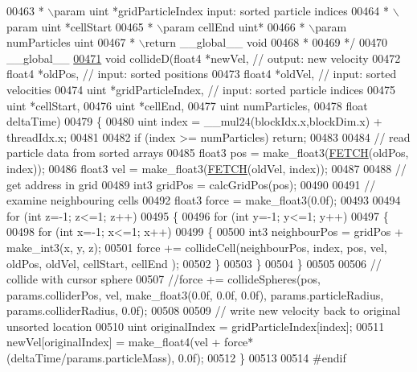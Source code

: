\begin{DoxyCode}
00463 \textcolor{comment}{ * \(\backslash\)param uint   *gridParticleIndex input: sorted particle indices}
00464 \textcolor{comment}{ * \(\backslash\)param uint   *cellStart}
00465 \textcolor{comment}{ * \(\backslash\)param cellEnd uint*}
00466 \textcolor{comment}{ * \(\backslash\)param numParticles uint}
00467 \textcolor{comment}{ * \(\backslash\)return \_\_global\_\_ void}
00468 \textcolor{comment}{ *}
00469 \textcolor{comment}{ */}
00470 \_\_global\_\_
\hypertarget{particles__kernel__impl_8cuh_source_l00471}{}\hyperlink{particles__kernel__impl_8cuh_a295ed0293da0aab40ac5d904c319abdf}{00471} \textcolor{keywordtype}{void} collideD(float4 *newVel,               \textcolor{comment}{// output: new velocity}
00472               float4 *oldPos,               \textcolor{comment}{// input: sorted positions}
00473               float4 *oldVel,               \textcolor{comment}{// input: sorted velocities}
00474               uint   *gridParticleIndex,    \textcolor{comment}{// input: sorted particle indices}
00475               uint   *cellStart,
00476               uint   *cellEnd,
00477               uint    numParticles,
00478                           \textcolor{keywordtype}{float} deltaTime)
00479 \{
00480     uint index = \_\_mul24(blockIdx.x,blockDim.x) + threadIdx.x;
00481 
00482     \textcolor{keywordflow}{if} (index >= numParticles) \textcolor{keywordflow}{return};
00483 
00484     \textcolor{comment}{// read particle data from sorted arrays}
00485     float3 pos = make\_float3(\hyperlink{particles__kernel_8cuh_a12269d678a65f18889c2a7e98c756457}{FETCH}(oldPos, index));
00486     float3 vel = make\_float3(\hyperlink{particles__kernel_8cuh_a12269d678a65f18889c2a7e98c756457}{FETCH}(oldVel, index));
00487 
00488     \textcolor{comment}{// get address in grid}
00489     int3 gridPos = calcGridPos(pos);
00490 
00491     \textcolor{comment}{// examine neighbouring cells}
00492     float3 force = make\_float3(0.0f);
00493 
00494     \textcolor{keywordflow}{for} (\textcolor{keywordtype}{int} z=-1; z<=1; z++)
00495     \{
00496         \textcolor{keywordflow}{for} (\textcolor{keywordtype}{int} y=-1; y<=1; y++)
00497         \{
00498             \textcolor{keywordflow}{for} (\textcolor{keywordtype}{int} x=-1; x<=1; x++)
00499             \{
00500                 int3 neighbourPos = gridPos + make\_int3(x, y, z);
00501                 force += collideCell(neighbourPos, index, pos, vel, oldPos, oldVel, cellStart, cellEnd
      );
00502             \}
00503         \}
00504     \}
00505 
00506     \textcolor{comment}{// collide with cursor sphere}
00507     \textcolor{comment}{//force += collideSpheres(pos, params.colliderPos, vel, make\_float3(0.0f, 0.0f, 0.0f),
       params.particleRadius, params.colliderRadius, 0.0f);}
00508 
00509     \textcolor{comment}{// write new velocity back to original unsorted location}
00510     uint originalIndex = gridParticleIndex[index];
00511     newVel[originalIndex] = make\_float4(vel + force*(deltaTime/params.particleMass), 0.0f);
00512 \}
00513 
00514 \textcolor{preprocessor}{#}\textcolor{preprocessor}{endif}
\end{DoxyCode}
